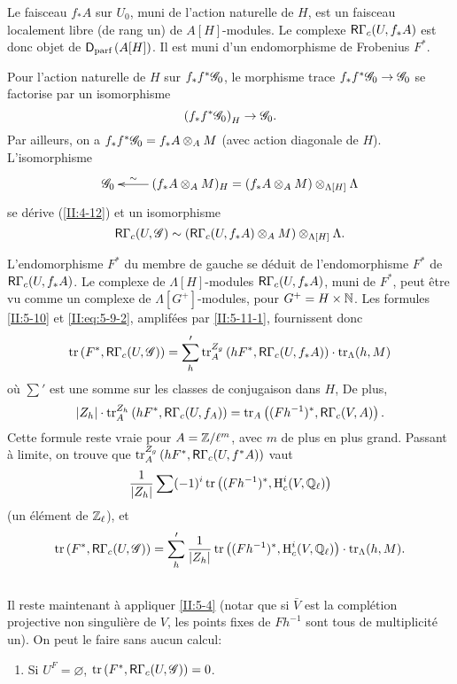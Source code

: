 Le faisceau $f_* A$ sur $U_0$, muni de l'action naturelle de $H$, est un 
faisceau localement libre (de rang un) de $A[H]$-modules. Le complexe 
$\mathsf{R}\Gamma_c(U,f_* A)$ est donc objet de $\mathsf{D}_\text{parf}\left(A[H]\right)$. Il 
est muni d'un endomorphisme de Frobenius $F^*$. 

Pour l'action naturelle de $H$ sur $f_* f^*\mathscr{G}_0$, le morphisme trace 
$f_* f^*\mathscr{G}_0\to\mathscr{G}_0$ se factorise par un isomorphisme 
\[
  \left(f_* f^*\mathscr{G}_0\right)_H \to \mathscr{G}_0 \text{.}
\]
Par ailleurs, on a $f_* f^*\mathscr{G}_0=f_* A\otimes_A M$ (avec action diagonale de 
$H$). L'isomorphisme 
\[\xymatrix{
  \cG_0 
    & \ar[l]_-\sim (f_* A\otimes_A M)_H = (f_* A\otimes_A M)\otimes_{\Lambda[H]} \Lambda
}\]
se d\'erive (\ref{II:4-12}) et un isomorphisme 
\[
  \mathsf{R}\Gamma_c(U,\mathscr{G}) \sim \left(\mathsf{R}\Gamma_c(U,f_* A)\otimes_A M\right)\otimes_{\Lambda[H]} \Lambda \text{.}
\]

L'endomorphisme $F^*$ du membre de gauche se d\'eduit de l'endomorphisme 
$F^*$ de $\mathsf{R}\Gamma_c(U,f_* A)$. Le complexe de $\Lambda[H]$-modules 
$\mathsf{R}\Gamma_c(U,f_* A)$, muni de $F^*$, peut \^etre vu comme un complexe de 
$\Lambda[G^+]$-modules, pour $G^+=H\times \mathbb{N}$. Les formules \ref{II:5-10} 
et \eqref{II:eq:5-9-2}, amplif\'ees par \ref{II:5-11-1}, fournissent donc 
\[
  \operatorname{tr}\left(F^*,\mathsf{R}\Gamma_c(U,\mathscr{G})\right) = \sum_h' \operatorname{tr}_A^{Z_g}\left(h F^*,\mathsf{R}\Gamma_c(U,f_* A)\right)\cdot \operatorname{tr}_\Lambda(h,M)
\]
o\`u $\sum'$ est une somme sur les classes de conjugaison dans $H$, De plus, 
\[
  |Z_h|\cdot \operatorname{tr}_A^{Z_h}\left(h F^*,\mathsf{R}\Gamma_c(U,f_ A)\right) = \operatorname{tr}_A\left((F h^{-1})^*,\mathsf{R}\Gamma_c(V,A)\right) \text{.}
\]
Cette formule reste vraie pour $A=\mathbb{Z}/\ell^m$, avec $m$ de plus en plus grand. 
Passant \`a limite, on trouve que 
$\operatorname{tr}_A^{Z_g}\left(h F^*,\mathsf{R}\Gamma_c(U,f^* A)\right)$ vaut 
\[
  \frac{1}{|Z_h|} \sum (-1)^i \operatorname{tr}\left((F h^{-1})^*,\operatorname{H}_c^i(V,\mathbb{Q}_\ell)\right)
\]
(un \'el\'ement de $\mathbb{Z}_\ell$), et
\begin{equation}\label{II:eq:5-12-1}
\operatorname{tr}\left(F^*,\mathsf{R}\Gamma_c(U,\mathscr{G})\right) = \sum_h' \frac{1}{|Z_h|} \operatorname{tr}\left((F h^{-1})^*,\operatorname{H}_c^i(V,\mathbb{Q}_\ell)\right)\cdot \operatorname{tr}_\Lambda(h,M) \text{.} 
\end{equation}





\subsection{}\label{II:5-13}

Il reste maintenant \`a appliquer \ref{II:5-4} (notar que si $\bar V$ est la 
compl\'etion projective non singuli\`ere de $V$, les points fixes de $F h^{-1}$ 
sont tous de multiplicit\'e un). On peut le faire sans aucun calcul: 
\begin{enumerate}[\indent A.]
  \item Si $U^F=\varnothing$, $\operatorname{tr}\left(F^*,\mathsf{R}\Gamma_c(U,\mathscr{G})\right) = 0$. \end{enumerate}

